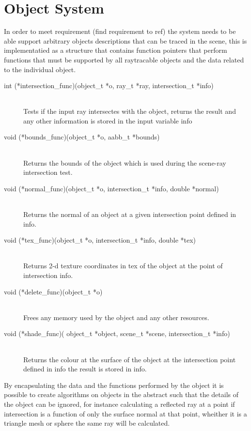 \section{Object System}
In order to meet requirement \todo(find requirement to ref) the system needs to be able support arbitrary objects descriptions
that can be traced in the scene, this is implementatied as a structure that contains function pointers that perform functions
that must be supported by all raytracable objects and the data related to the individual object.

\begin{description}
\item[int  (*intersection\_func)(object\_t *o, ray\_t *ray, intersection\_t *info)] \hfill \\
	Tests if the input ray intersectes with the object, returns the result and any other information is stored in the input variable info
\item[void (*bounds\_func)(object\_t *o, aabb\_t *bounds)] \hfill \\
	Returns the bounds of the object which is used during the scene-ray intersection test.
\item[void (*normal\_func)(object\_t *o, intersection\_t *info, double *normal)] \hfill \\
	Returns the normal of an object at a given intersection point defined in info.
\item[void (*tex\_func)(object\_t *o, intersection\_t *info, double *tex)] \hfill \\
	Returns 2-d texture coordinates in tex of the object at the point of intersection info.
\item[void (*delete\_func)(object\_t *o)] \hfill \\
	Frees any memory used by the object and any other resources.
\item[void (*shade\_func)( object\_t *object, scene\_t *scene, intersection\_t *info)] \hfill \\
	Returns the colour at the surface of the object at the intersection point defined in info the result is stored in info.
\end{description}

By encapsulating the data and the functions performed by the object it is possible to create algorithms on objects in the
abstract such that the details of the object can be ignored, for instance calculating a reflected ray at a point if intersection
is a function of only the surface normal at that point, wheither it is a triangle mesh or sphere the same ray will be calculated.

